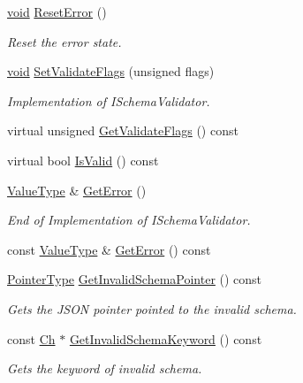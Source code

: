 \begin{DoxyCompactItemize}
\hyperlink{imgui__impl__opengl3__loader_8h_ac668e7cffd9e2e9cfee428b9b2f34fa7}{void} \hyperlink{classGenericSchemaValidator_a8374dd359e572f653c49293545ad3ef4}{Reset\+Error} ()
\begin{DoxyCompactList}\small\item\em Reset the error state. \end{DoxyCompactList}\item 
\hyperlink{imgui__impl__opengl3__loader_8h_ac668e7cffd9e2e9cfee428b9b2f34fa7}{void} \hyperlink{classGenericSchemaValidator_af4840dac2410bcfe73912c30eb95b875}{Set\+Validate\+Flags} (unsigned flags)
\begin{DoxyCompactList}\small\item\em Implementation of I\+Schema\+Validator. \end{DoxyCompactList}\item 
virtual unsigned \hyperlink{classGenericSchemaValidator_a318bf1cf98d2f18074edd336b1bc684d}{Get\+Validate\+Flags} () const
\item 
virtual bool \hyperlink{classGenericSchemaValidator_a8ebda4da3d8b1fc41e57f15dd62e8f19}{Is\+Valid} () const
\item 
\hyperlink{classGenericSchemaValidator_a435890a2dddeecb896d4ac76de03ca68}{Value\+Type} \& \hyperlink{classGenericSchemaValidator_a7af476e6940d935efcf79d823c933035}{Get\+Error} ()
\begin{DoxyCompactList}\small\item\em End of Implementation of I\+Schema\+Validator. \end{DoxyCompactList}\item 
const \hyperlink{classGenericSchemaValidator_a435890a2dddeecb896d4ac76de03ca68}{Value\+Type} \& \hyperlink{classGenericSchemaValidator_a15bad1493265a83928c869dbeb034ef0}{Get\+Error} () const
\item 
\hyperlink{classGenericSchemaValidator_ae0c6c9a9c0ff6bae80e75c6705f2668b}{Pointer\+Type} \hyperlink{classGenericSchemaValidator_a5b8f2d5c466b2a362e2e4c3bcfbfc5a8}{Get\+Invalid\+Schema\+Pointer} () const
\begin{DoxyCompactList}\small\item\em Gets the J\+S\+ON pointer pointed to the invalid schema. \end{DoxyCompactList}\item 
const \hyperlink{classGenericSchemaValidator_a8b7dab5a0cda9cc0adaefb4401d260c1}{Ch} $\ast$ \hyperlink{classGenericSchemaValidator_ab71ec18e5a013e5153a10b312a4f03bc}{Get\+Invalid\+Schema\+Keyword} () const
\begin{DoxyCompactList}\small\item\em Gets the keyword of invalid schema. \end{DoxyCompactList}\item 

\end{DoxyCompactItemize}
